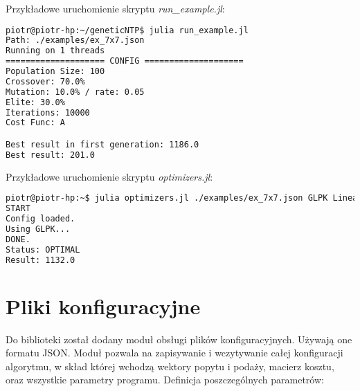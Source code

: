 Przykładowe uruchomienie skryptu \textit{run\_example.jl}:

\begin{lstlisting}[language=bash, frame=single]
piotr@piotr-hp:~/geneticNTP$ julia run_example.jl 
Path: ./examples/ex_7x7.json
Running on 1 threads
==================== CONFIG ====================
Population Size: 100
Crossover: 70.0%
Mutation: 10.0% / rate: 0.05
Elite: 30.0%
Iterations: 10000
Cost Func: A

Best result in first generation: 1186.0
Best result: 201.0
\end{lstlisting}

Przykładowe uruchomienie skryptu \textit{optimizers.jl}:

\begin{lstlisting}[language=bash, frame=single]
piotr@piotr-hp:~$ julia optimizers.jl ./examples/ex_7x7.json GLPK Linear
START
Config loaded.
Using GLPK...
DONE.
Status: OPTIMAL
Result: 1132.0
\end{lstlisting}

\section{Pliki konfiguracyjne}

Do biblioteki został dodany moduł obsługi plików konfiguracyjnych. Używają one formatu JSON. Moduł pozwala na zapisywanie i wczytywanie 
całej konfiguracji algorytmu, w skład której wchodzą wektory popytu i podaży, macierz kosztu, oraz wszystkie parametry programu.
Definicja poszczególnych parametrów:

